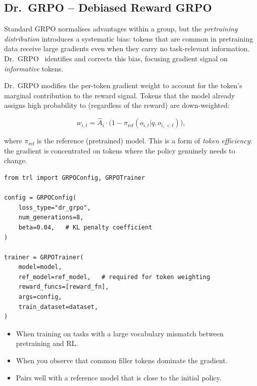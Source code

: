 \subsection{Dr.~GRPO -- Debiased Reward GRPO}
\label{sec:dr-grpo}

\begin{intuitionbox}
Standard GRPO normalises advantages within a group, but the \emph{pretraining distribution} introduces a systematic bias: tokens that are common in pretraining data receive large gradients even when they carry no task-relevant information. Dr.~GRPO~\cite{liu2024drgrpo} identifies and corrects this bias, focusing gradient signal on \emph{informative} tokens.
\end{intuitionbox}

Dr.~GRPO modifies the per-token gradient weight to account for the token’s marginal contribution to the reward signal. Tokens that the model already assigns high probability to (regardless of the reward) are down-weighted:

\[
w_{i,t} = \hat{A}_i \cdot \bigl(1 - \pi_{\text{ref}}(o_{i,t}|q,o_{i,<t})\bigr),
\]

where $\pi_{\text{ref}}$ is the reference (pretrained) model. This is a form of \emph{token efficiency}: the gradient is concentrated on tokens where the policy genuinely needs to change.

\begin{examplebox}
\begin{lstlisting}[style=pythonstyle]
from trl import GRPOConfig, GRPOTrainer

config = GRPOConfig(
    loss_type="dr_grpo",
    num_generations=8,
    beta=0.04,   # KL penalty coefficient
)

trainer = GRPOTrainer(
    model=model,
    ref_model=ref_model,   # required for token weighting
    reward_funcs=[reward_fn],
    args=config,
    train_dataset=dataset,
)
\end{lstlisting}
\end{examplebox}

\begin{keybox}
\begin{itemize}
  \item When training on tasks with a large vocabulary mismatch between pretraining and RL.
  \item When you observe that common filler tokens dominate the gradient.
  \item Pairs well with a reference model that is close to the initial policy.
\end{itemize}
\end{keybox}


